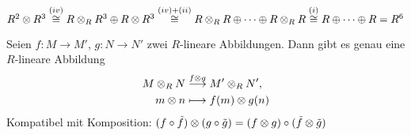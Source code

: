 \documentclass[../main.tex]{subfiles}
\begin{document}
\begin{example*}
    $R^2 \otimes R^3 \overset{(iv)}{\cong} R\otimes_R R^3 \oplus R\otimes R^3 \overset{(iv)+(ii)}{\cong} R\otimes_R R \oplus \dots \oplus R\otimes_R R \overset{(i)}{\cong}R\oplus\dots \oplus R = R^6$
\end{example*}
\begin{remark}
Seien $f:M\rightarrow M'$, $g:N\rightarrow N'$ zwei $R$-lineare Abbildungen. Dann gibt es genau eine $R$-lineare Abbildung 
\begin{align*}
    M\otimes_R N &\overset{f\otimes g}{\longrightarrow} M'\otimes_R N',\\
    m\otimes n &\longmapsto f(m)\otimes g(n)
\end{align*}
Kompatibel mit Komposition:
$(f\circ \Tilde{f}) \otimes (g\circ \Tilde{g}) = (f\otimes g) \circ (\Tilde{f}\otimes \Tilde{g})$
\end{remark}
\end{document}
